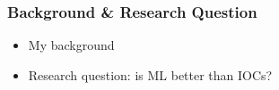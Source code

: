 \begin{frame}
\frametitle{Background \& Research Question}
\begin{itemize}
  \item My background
  \item Research question: is ML better than IOCs?
\end{itemize}
\end{frame}